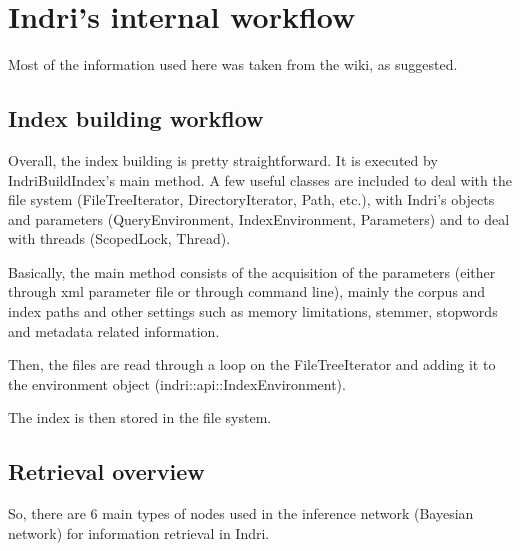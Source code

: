 \documentclass{article} %
\begin{document}
\section{Indri's internal workflow}
\label{indri_workflow}

Most of the information used here was taken from the wiki, as suggested.


\subsection{Index building workflow}

Overall, the index building is pretty straightforward. It is executed by IndriBuildIndex's main method. A few useful classes are included to deal with the file system (FileTreeIterator, DirectoryIterator, Path, etc.), with Indri's objects and parameters (QueryEnvironment, IndexEnvironment, Parameters) and to deal with threads (ScopedLock, Thread). \newline

Basically, the main method consists of the acquisition of the parameters (either through xml parameter file or through command line), mainly the corpus and index paths and other settings such as memory limitations, stemmer, stopwords and metadata related information.

Then, the files are read through a loop on the FileTreeIterator and adding it to the environment object (indri::api::IndexEnvironment).

The index is then stored in the file system.


\subsection{Retrieval overview}
\label{retrieval_overview}

So, there are 6 main types of nodes used in the inference network (Bayesian network) for information retrieval in Indri.\newline
\end{document}

